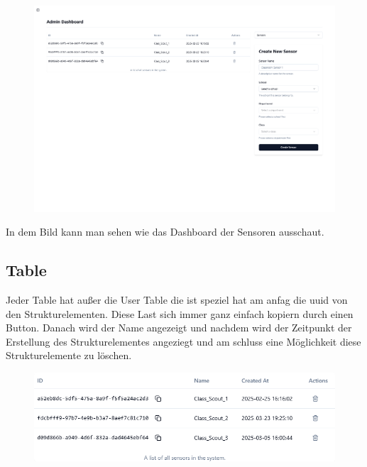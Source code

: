 \begin{inhalt}
\begin{enumerate}[label=\textbf{\arabic*.}]
\begin{figure}[!htb]
\centering
\includegraphics[width=1\textwidth]{files/Thomas/pics/Website/admin/devices/devices-screen.png}
\caption[Bildbezeichnung für Abbildungsverzeichnis]{}
\label{fig:gehaeuse_internet_bild}
\end{figure}

\clearpage


In dem Bild kann man sehen wie das Dashboard der Sensoren ausschaut.

\subsection{Table}

Jeder Table hat außer die User Table die ist speziel hat am anfag die uuid von den Strukturelementen. Diese Last sich immer ganz einfach kopiern durch einen Button. Danach wird der Name angezeigt und nachdem wird der Zeitpunkt der Erstellung des Strukturelementes angeziegt und am schluss eine Möglichkeit diese Strukturelemente zu löschen. 

\begin{figure}[!htb]
\centering
\includegraphics[width=1\textwidth]{files/Thomas/pics/Website/admin/sensors/sensor-table.png}
\caption[Bildbezeichnung für Abbildungsverzeichnis]{}
\label{fig:gehaeuse_internet_bild}
\end{figure}


\end{enumerate}
\end{inhalt}
